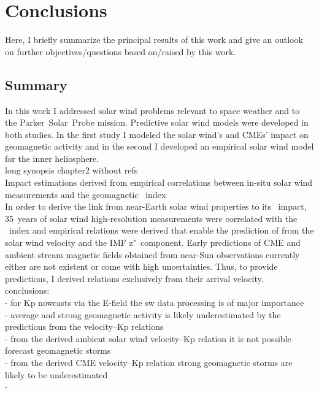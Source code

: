 
\chapter{Conclusions}
\label{chap:summary}

Here, I briefly summarize the principal results of this work and give an outlook on further objectives/questions based on/raised by this work.

\section{Summary}

In this work I addressed solar wind problems relevant to space weather and to the Parker~Solar~Probe mission. Predictive solar wind models were developed in both studies. In the first study I modeled the solar wind's and CMEs' impact on geomagnetic activity and in the second I developed an empirical solar wind model for the inner heliosphere.\\


long synopsis chapter2 without refs\\

Impact estimations derived from empirical correlations between in-situ solar wind measurements and the geomagnetic \Kp{}~index\\

In order to derive the link from near-Earth solar wind properties to its \Kp{}~impact, 35~years of solar wind high-resolution measurements were correlated with the \Kp~index and empirical relations were derived that enable the prediction of \Kp{} from the solar wind velocity and the IMF z"~component. Early predictions of CME and ambient stream magnetic fields obtained from near-Sun observations currently either are not existent or come with high uncertainties. Thus, to provide \Kp{} predictions, I derived relations exclusively from their arrival velocity.\\


conclusions:\\
- for Kp nowcasts via the E-field the sw data processing is of major importance\\
- average and strong geomagnetic activity is likely underestimated by the predictions from the velocity--Kp relations\\
- from the derived ambient solar wind velocity--Kp relation it is not possible forecast geomagnetic storms\\
- from the derived CME velocity--Kp relation strong geomagnetic storms are likely to be underestimated\\
- \\



